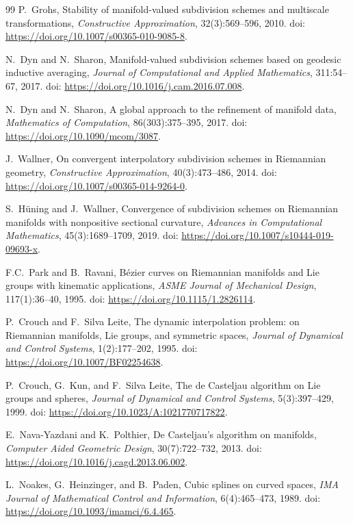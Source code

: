\documentclass{article}
\theoremstyle{plain}
\theoremstyle{definition}
\begin{document}
\begin{thebibliography}{99}
P.\ Grohs,
Stability of manifold-valued subdivision schemes and multiscale transformations,
\textit{Constructive Approximation}, 32(3):569--596, 2010.
doi: \url{https://doi.org/10.1007/s00365-010-9085-8}.

N.\ Dyn and N.\ Sharon,
Manifold-valued subdivision schemes based on geodesic inductive averaging,
\textit{Journal of Computational and Applied Mathematics}, 311:54--67, 2017.
doi: \url{https://doi.org/10.1016/j.cam.2016.07.008}.

N.\ Dyn and N.\ Sharon,
A global approach to the refinement of manifold data,
\textit{Mathematics of Computation}, 86(303):375--395, 2017.
doi: \url{https://doi.org/10.1090/mcom/3087}.

J.\ Wallner,
On convergent interpolatory subdivision schemes in Riemannian geometry,
\textit{Constructive Approximation}, 40(3):473--486, 2014.
doi: \url{https://doi.org/10.1007/s00365-014-9264-0}.

S.\ H\"{u}ning and J.\ Wallner,
Convergence of subdivision schemes on Riemannian manifolds with nonpositive
sectional curvature,
\textit{Advances in Computational Mathematics}, 45(3):1689--1709, 2019.
doi: \url{https://doi.org/10.1007/s10444-019-09693-x}.

F.C.\ Park and B.\ Ravani,
B\'{e}zier curves on Riemannian manifolds and Lie groups with kinematic
applications,
\textit{ASME Journal of Mechanical Design}, 117(1):36--40, 1995.
doi: \url{https://doi.org/10.1115/1.2826114}.

P.\ Crouch and F.\ Silva Leite,
The dynamic interpolation problem: on Riemannian manifolds, Lie groups, and
symmetric spaces,
\textit{Journal of Dynamical and Control Systems}, 1(2):177--202, 1995.
doi: \url{https://doi.org/10.1007/BF02254638}.

P.\ Crouch, G.\ Kun, and F.\ Silva Leite,
The de Casteljau algorithm on Lie groups and spheres,
\textit{Journal of Dynamical and Control Systems}, 5(3):397--429, 1999.
doi: \url{https://doi.org/10.1023/A:1021770717822}.

E.\ Nava-Yazdani and K.\ Polthier,
De Casteljau's algorithm on manifolds,
\textit{Computer Aided Geometric Design}, 30(7):722--732, 2013.
doi: \url{https://doi.org/10.1016/j.cagd.2013.06.002}.

L.\ Noakes, G.\ Heinzinger, and B.\ Paden,
Cubic splines on curved spaces,
\textit{IMA Journal of Mathematical Control and Information}, 6(4):465--473, 1989.
doi: \url{https://doi.org/10.1093/imamci/6.4.465}.


\end{thebibliography}
\end{document}
